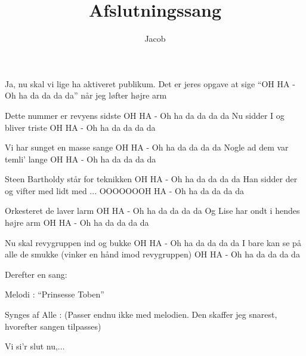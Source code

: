 \documentclass[a4paper,11pt]{article}
\title{Afslutningssang}
\author{Jacob}
\begin{document}
\maketitle
\begin{roles}
\end{roles}

\begin{sketch}

Ja, nu skal vi lige ha aktiveret publikum. Det er jeres opgave at sige
``OH HA - Oh ha da da da da'' når jeg løfter højre arm

Dette nummer er revyens sidste
OH HA - Oh ha da da da da
Nu sidder I og bliver triste
OH HA - Oh ha da da da da

\bigskip

Vi har sunget en masse sange
OH HA - Oh ha da da da da
Nogle ad dem var temli' lange
OH HA - Oh ha da da da da

\bigskip

Steen Bartholdy står for teknikken
OH HA - Oh ha da da da da
Han sidder der og vifter med lidt med ...
OOOOOOOH HA - Oh ha da da da da

\bigskip

Orkesteret de laver larm
OH HA - Oh ha da da da da
Og Lise har ondt i hendes højre arm
OH HA - Oh ha da da da da

\bigskip

Nu skal revygruppen ind og bukke
OH HA - Oh ha da da da da
I bare kan se på alle de smukke  (vinker en hånd imod revygruppen)
OH HA - Oh ha da da da da

\bigskip

\scene
Derefter en sang:

Melodi : ``Prinsesse Toben''

\rm

Synges af Alle : (Passer endnu ikke med melodien. Den skaffer jeg
snarest, hvorefter sangen tilpasses)

\bigskip

Vi si'r slut nu,...
\end{sketch}
\end{document}
